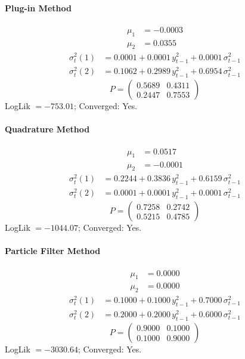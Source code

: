 \documentclass[11pt, a4paper]{article}
\begin{document}
\paragraph{Plug-in Method}
\begin{align}
\mu_{1} &= -0.0003 \\
\mu_{2} &= 0.0355
\end{align}
\begin{align}
\sigma^2_{t}(1) &= 0.0001 + 0.0001\, y_{t-1}^2 + 0.0001\, \sigma^2_{t-1} \\
\sigma^2_{t}(2) &= 0.1062 + 0.2989\, y_{t-1}^2 + 0.6954\, \sigma^2_{t-1}
\end{align}
\begin{equation}
P = \begin{pmatrix} 0.5689 & 0.4311 \\ 0.2447 & 0.7553 \end{pmatrix}
\end{equation}
LogLik $= -753.01$; Converged: Yes.

\paragraph{Quadrature Method}
\begin{align}
\mu_{1} &= 0.0517 \\
\mu_{2} &= -0.0001
\end{align}
\begin{align}
\sigma^2_{t}(1) &= 0.2244 + 0.3836\, y_{t-1}^2 + 0.6159\, \sigma^2_{t-1} \\
\sigma^2_{t}(2) &= 0.0001 + 0.0001\, y_{t-1}^2 + 0.0001\, \sigma^2_{t-1}
\end{align}
\begin{equation}
P = \begin{pmatrix} 0.7258 & 0.2742 \\ 0.5215 & 0.4785 \end{pmatrix}
\end{equation}
LogLik $= -1044.07$; Converged: Yes.

\paragraph{Particle Filter Method}
\begin{align}
\mu_{1} &= 0.0000 \\
\mu_{2} &= 0.0000
\end{align}
\begin{align}
\sigma^2_{t}(1) &= 0.1000 + 0.1000\, y_{t-1}^2 + 0.7000\, \sigma^2_{t-1} \\
\sigma^2_{t}(2) &= 0.2000 + 0.2000\, y_{t-1}^2 + 0.6000\, \sigma^2_{t-1}
\end{align}
\begin{equation}
P = \begin{pmatrix} 0.9000 & 0.1000 \\ 0.1000 & 0.9000 \end{pmatrix}
\end{equation}
LogLik $= -3030.64$; Converged: Yes.
\end{document}
